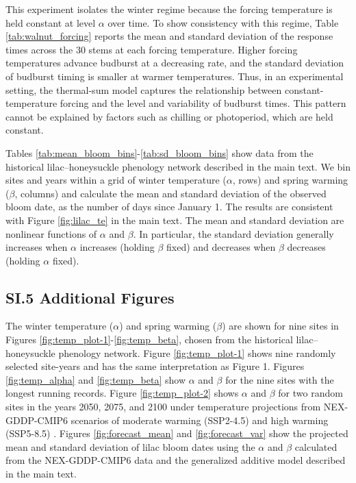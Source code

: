 \documentclass[12pt,letterpaper]{article}
\begin{document}
This experiment isolates the winter regime because the forcing temperature is held
constant at level \(\alpha\) over time. To show consistency with this regime, Table 
\ref{tab:walnut_forcing} reports the mean and standard deviation
of the response times across the 30 stems at each forcing temperature.
Higher forcing temperatures advance budburst at a decreasing rate, 
and the standard deviation of budburst timing is 
smaller at warmer temperatures. Thus, in an experimental setting, the 
thermal-sum model captures the relationship between
constant-temperature forcing and the level and variability of
budburst times. This pattern cannot be explained by factors such as chilling or photoperiod, which are held constant.

Tables \ref{tab:mean_bloom_bins}-\ref{tab:sd_bloom_bins} show data from
the historical lilac--honeysuckle phenology network described in the main text. 
We bin sites and years within a grid of winter temperature (\(\alpha\), rows) and spring warming (\(\beta\), columns) 
and calculate the mean and standard deviation of the observed bloom date, as the number of days since January 1. 
The results are consistent with Figure \ref{fig:lilac_te} in the main text.
The mean and standard deviation are nonlinear functions of $\alpha$ and $\beta$. In particular, the standard deviation generally increases when
$\alpha$ increases (holding $\beta$ fixed) and decreases when $\beta$ decreases (holding $\alpha$ fixed). 

\subsection*{SI.5 Additional Figures}\label{si-additional-figures}

The winter temperature (\(\alpha\)) and spring warming (\(\beta\)) are shown for nine sites in Figures \ref{fig:temp_plot-1}-\ref{fig:temp_beta}, chosen from the historical lilac--honeysuckle phenology network. Figure \ref{fig:temp_plot-1} shows nine randomly selected site-years and has the same interpretation as Figure 1. Figures \ref{fig:temp_alpha} and \ref{fig:temp_beta} show \(\alpha\) and \(\beta\) for the nine sites with the longest running records. Figure \ref{fig:temp_plot-2} shows \(\alpha\) and \(\beta\) for two random sites in the years 2050, 2075, and 2100 under temperature projections from NEX-GDDP-CMIP6 scenarios of moderate warming (SSP2-4.5) and high warming (SSP5-8.5) \citep{thrasher2022nasa}. Figures \ref{fig:forecast_mean} and \ref{fig:forecast_var} show the projected mean and standard deviation of lilac bloom dates using the \(\alpha\) and \(\beta\) calculated from the NEX-GDDP-CMIP6 data and the generalized additive model described in the main text. 
\end{document}

